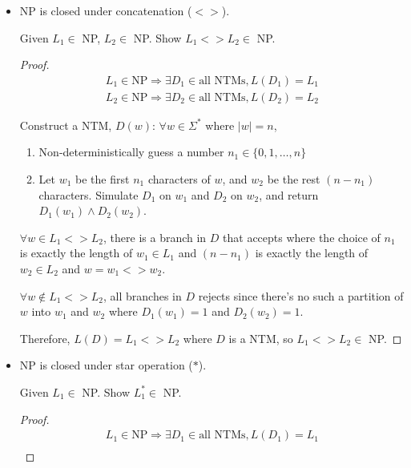 \documentclass[twoside,11pt]{homework}
\begin{document}
\begin{solution}
\begin{itemize}
\begin{proof}
    \end{proof}

  \item NP is closed under concatenation ($<>$).
    \begin{goal}
      Given $L_1 \in$ NP, $L_2 \in$ NP.
      Show $L_1 <> L_2 \in$ NP.
    \end{goal}
    \begin{proof}
      \[
        \begin{aligned}
        L_1 \in \text{NP} \Rightarrow \exists D_1 \in \text{all NTMs}, L(D_1) = L_1\\
        L_2 \in \text{NP} \Rightarrow \exists D_2 \in \text{all NTMs}, L(D_2) = L_2
        \end{aligned}
      \]

      Construct a NTM, $D(w)$: $\forall w \in \Sigma^*$ where $|w| = n$,
      \begin{enumerate}
      \item Non-deterministically guess a number $n_1 \in \{0, 1, \dots, n\}$
      \item Let $w_1$ be the first $n_1$ characters of $w$, and $w_2$ be the
        rest $(n-n_1)$ characters.
        Simulate $D_1$ on $w_1$ and $D_2$ on $w_2$, and return $D_1(w_1)
        \land D_2(w_2)$.
      \end{enumerate}
      
      $\forall w \in L_1 <> L_2$, there is a branch in $D$ that accepts where
      the choice of $n_1$ is exactly the length of $w_1 \in L_1$ and $(n - n_1)$ is
      exactly the length of $w_2 \in L_2$ and $w = w_1 <> w_2$.

      $\forall w \notin L_1 <> L_2$, all branches in
      $D$ rejects since there's no such a partition of $w$ into $w_1$ and $w_2$
      where $D_1(w_1)=1 $ and $D_2(w_2)=1$.

      Therefore, $L(D) = L_1 <> L_2$ where $D$ is a NTM, so $L_1 <> L_2 \in$ NP.
    \end{proof}

  \item NP is closed under star operation ($*$).

    \begin{goal}
      Given $L_1 \in$ NP.
      Show $L_1^* \in$ NP.
    \end{goal}
    \begin{proof}
      \[
        \begin{aligned}
        L_1 \in \text{NP} \Rightarrow \exists D_1 \in \text{all NTMs}, L(D_1) = L_1\\
        \end{aligned}
      \]


\end{proof}
\end{itemize}
\end{solution}
\end{document}
